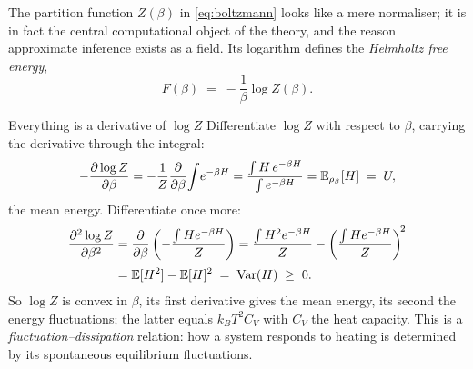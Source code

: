 The partition function $Z(\beta)$ in \eqref{eq:boltzmann} looks like a
mere normaliser; it is in fact the central computational object of the
theory, and the reason approximate inference exists as a field. Its
logarithm defines the \emph{Helmholtz free energy},
\begin{equation}
  F(\beta) \;=\; -\frac{1}{\beta} \log Z(\beta).
  \label{eq:free-energy}
\end{equation}

\begin{toolbox}{Everything is a derivative of $\log Z$}
Differentiate $\log Z$ with respect to $\beta$, carrying the derivative
through the integral:
\begin{equation*}
  -\frac{\partial \log Z}{\partial \beta}
  = -\frac{1}{Z}\frac{\partial}{\partial \beta}\!\int\! e^{-\beta H}
  = \frac{\int H\, e^{-\beta H}}{\int e^{-\beta H}}
  = \mathbb{E}_{\rho_\beta}[H] \;=\; U ,
\end{equation*}
the mean energy. Differentiate once more:
\begin{align*}
  \frac{\partial^2 \log Z}{\partial \beta^2}
  &= \frac{\partial}{\partial \beta}
     \left( -\frac{\int H e^{-\beta H}}{Z} \right)
   = \frac{\int H^2 e^{-\beta H}}{Z}
     - \left( \frac{\int H e^{-\beta H}}{Z} \right)^{\!2} \\[2pt]
  &= \mathbb{E}[H^2] - \mathbb{E}[H]^2 \;=\; \operatorname{Var}(H) \;\geq\; 0 .
\end{align*}
So $\log Z$ is convex in $\beta$, its first derivative gives the mean
energy, its second the energy fluctuations; the latter equals
$k_B T^2 C_V$ with $C_V$ the heat capacity. This is a
\emph{fluctuation--dissipation} relation: how a system responds to
heating is determined by its spontaneous equilibrium fluctuations.


\end{toolbox}
